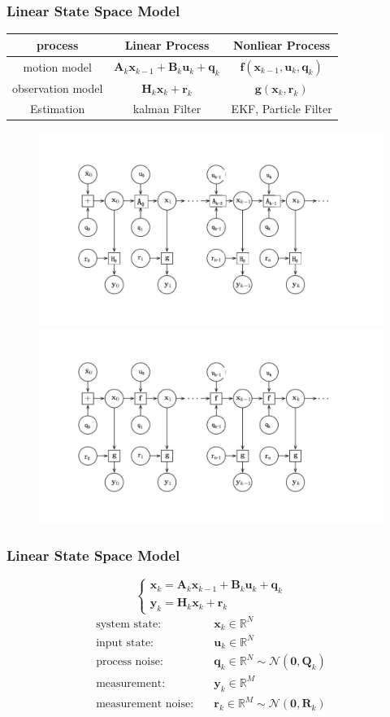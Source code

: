 \documentclass[14pt,hyperref={CJKbookmarks=true}]{beamer}
\theoremstyle{plain}
\theoremstyle{definition}
\theoremstyle{remark}
\begin{document}
\begin{frame}
\frametitle{Linear State Space Model}
\begin{table}
\small
\begin{tabular}{c c c}
\toprule[1pt]
process & Linear Process & Nonliear Process\\
\midrule[0.5pt]
motion model &$\mathbf{A}_{k}\mathbf{x}_{k-1}+\mathbf{B}_{k}\mathbf{u}_{k}+\mathbf{q}_{k}$ & $\mathbf{f}(\mathbf{x}_{k-1},\mathbf{u}_{k},\mathbf{q}_{k})$\\
observation model &  $\mathbf{H}_k\mathbf{x}_k+\mathbf{r}_k$ &  $\mathbf{g}(\mathbf{x}_k,\mathbf{r}_k)$ \\
Estimation & kalman Filter& EKF, Particle Filter\\
\bottomrule[1pt]
\end{tabular}
\end{table}
\begin{figure}
\centering
\includegraphics[width=0.45\linewidth]{state1.pdf}
\includegraphics[width=0.45\linewidth]{state2.pdf}
\end{figure}
\end{frame}


\begin{frame}
\frametitle{Linear State Space Model}
\small
\begin{equation*}
\begin{cases}
\mathbf{x}_k=\mathbf{A}_{k}\mathbf{x}_{k-1}+\mathbf{B}_{k}\mathbf{u}_{k}+\mathbf{q}_{k}\\
\mathbf{y}_k=\mathbf{H}_k\mathbf{x}_k+\mathbf{r}_k
\end{cases}
\end{equation*}
\pause
\begin{equation*}
\begin{split}
\text{system state:}\quad&\mathbf{x}_k\in\mathbb{R}^N\\
\text{input state:}\quad &\mathbf{u}_k\in\mathbb{R}^N\\
\text{process noise:}\quad &\mathbf{q}_k\in\mathbb{R}^N\sim \mathcal{N}(\mathbf{0},\mathbf{Q}_k)\\
\text{measurement:}\quad& \mathbf{y}_k\in\mathbb{R}^M\\
\text{measurement noise:}\quad& \mathbf{r}_k\in\mathbb{R}^M\sim \mathcal{N}(\mathbf{0},\mathbf{R}_k)\\
\end{split}
\end{equation*}
\end{frame}
\end{document}
